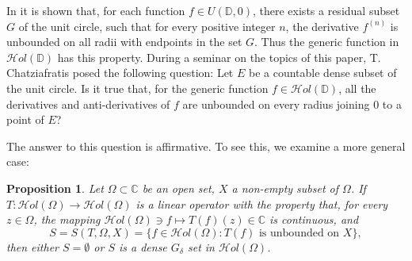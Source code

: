 \documentclass[11pt,twoside,a4paper]{article}
\newtheorem{proposition}[theorem]{Proposition}
\theoremstyle{remark}
\def\d{\delta}
\newcommand{\hol}{{\mathcal Hol}}
\newcommand{\holo}{{\mathcal Hol}(\Omega)}
\begin{document}
\par
In \cite{armitage2006boundary} it is shown that, for each function $f \in U(\mathbb{D},0)$, there exists a residual subset $G$ of the unit circle, such that for every positive integer $n$, the derivative $f^{(n)}$ is unbounded on all radii with endpoints in the set $G$. Thus the generic function in $\hol (\mathbb{D})$ has this property. During a seminar on the topics of this paper, T. Chatziafratis posed the following question: Let $E$ be a countable dense subset of the unit circle. Is it true that, for the generic function $f \in \hol(\mathbb{D})$, all the derivatives and anti-derivatives of $f$ are unbounded on every radius joining $0$ to a point of $E$?
\par
The answer to this question is affirmative. To see this, we examine a more general case:
\begin{proposition}
\label{general either or}
Let $\Omega \subset \mathbb{C}$ be an open set, $X$ a non-empty subset of $\Omega$.  \newline If $T: \holo \rightarrow \holo$ is a linear operator with the property that, for every $z \in \Omega$, the mapping $ \holo \ni f \mapsto T(f)(z) \in \mathbb{C}$ is continuous, and
\begin{equation*}
  S=S(T,\Omega,X)=\{f \in \holo: T(f) \text{ is unbounded on } X\},
\end{equation*}
 then either $S = \emptyset$ or $S$ is a dense $G_\d$ set in $\holo$.
\end{proposition}
\end{document}
